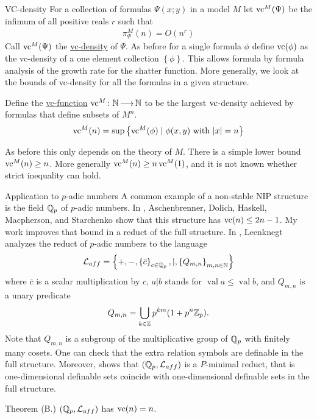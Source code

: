 \documentclass[final]{beamer}
\newcommand{\curly}[1]{\left\{ #1 \right\}}
\newcommand{\defn}{\underline}
\DeclareMathOperator{\vval}{val}
\newlength{\onecolwid}
\begin{document}
\begin{frame}[t]
\begin{columns}[t]
\begin{column}{\onecolwid}
\begin{block}{VC-density}
        For a collection of formulas $\Psi(x; y)$ in a model $M$ let $\operatorname{vc}^M(\Psi)$ be the infimum of all positive reals $r$ such that
            \begin{align*}
                \pi^M_\Psi(n) = O(n^r)
            \end{align*}
            Call $\operatorname{vc}^M(\Psi)$ the \defn{vc-density} of $\Psi$.
        As before for a single formula $\phi$ define $\operatorname{vc}(\phi)$ as the vc-density of a one element collection $\curly{\phi}$.
        This allows formula by formula analysis of the growth rate for the shatter function.
        More generally, we look at the bounds of vc-density for all the formulas in a given structure.

        Define the \defn{vc-function} $\operatorname{vc}^M \colon \mathbb{N} \operatorname{\longrightarrow} \mathbb{N}$ to be the largest $\operatorname{vc}$-density achieved by formulas
        that define subsets of $M^n$.
            \begin{align*}
                \vc^M(n) = \sup \curly{ \vc^M(\phi) \mid \phi(x, y) \text{ with } |x| = n}
            \end{align*}        

        As before this only depends on the theory of $M$.
        There is a simple lower bound $\operatorname{vc}^M(n) \geq n$.
        More generally $\operatorname{vc}^M(n) \geq n\operatorname{vc}^M(1)$, and it is not known whether strict inequality can hold.
    \end{block}

    \begin{block}{Application to $p$-adic numbers}
        A common example of a non-stable NIP structure is the field $\mathbb{Q}_p$ of $p$-adic numbers.
	In \cite{density}, Aschenbrenner, Dolich, Haskell, Macpherson, and Starchenko show that this structure has $\operatorname{vc}(n) \leq 2n - 1$.
        My work improves that bound in a reduct of the full structure.
        In \cite{reduct}, Leenknegt analyzes the reduct of $p$-adic numbers to the language
        \begin{align*}
            \LL_{aff}  = \curly{+, -, \curly{\bar c}_{c \in \Q_p}, |, \curly{Q_{m,n}}_{m,n\in \N}}
        \end{align*}
        where $\bar c$ is a scalar multiplication by $c$,
        $a | b$ stands for $\vval a \leq \vval b$,
        and $Q_{m,n}$ is a unary predicate
        \begin{align*}
            Q_{m,n} = \bigcup_{k \in \mathbb{Z}} p^{km} (1 + p^n\mathbb{Z}_p).
        \end{align*}
	Note that $Q_{m,n}$ is a subgroup of the multiplicative group of $\mathbb{Q}_p$ with finitely many cosets.
        One can check that the extra relation symbols are definable in the full structure.
        Moreover, \cite{reduct} shows that $(\mathbb{Q}_p, \mathcal L_{aff})$ is a $P$-minimal reduct,
        that is one-dimensional definable sets coincide with one-dimensional definable sets in the full structure.
        \begin{alertblock} {Theorem (B.)}
            $(\mathbb{Q}_p, \mathcal L_{aff})$ has $\operatorname{vc}(n) = n$.
        \end{alertblock}
    \end{block}
    

\end{column}
\end{columns}
\end{frame}
\end{document}
